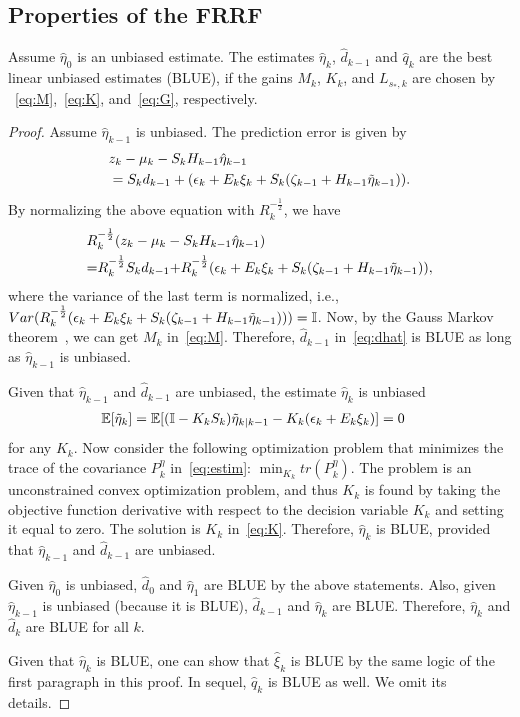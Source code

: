 \documentclass[letterpaper, 10 pt, conference]{ieeeconf}
\begin{document}
\subsection{Properties of the FRRF}\label{app:FRRFpro}
\begin{lemma}
Assume $\hat{\eta}_0$ is an unbiased estimate. The estimates $\hat{\eta}_k$, $\hat{d}_{k-1}$ and $\hat{q}_k$ are the best linear unbiased estimates (BLUE), if the gains $M_k$, $K_k$, and $L_{s_*,k}$ are chosen by
~\eqref{eq:M},~\eqref{eq:K}, and~\eqref{eq:G}, respectively.
\label{lemma:BLUE}
\end{lemma}
\begin{proof}
Assume $\hat{\eta}_{k-1}$ is unbiased. The prediction error is given by
\begin{align*}
    &z_k -\mu_{k} - S_{k}H_{k-1}\hat{\eta}_{k-1}\nonumber\\
    &=S_kd_{k-1}+(\epsilon_k+ E_k\xi_k+S_k(\zeta_{k-1}+H_{k-1}\tilde{\eta}_{k-1})).
\end{align*}
By normalizing the above equation with $R_k^{-\frac{1}{2}}$, we have
\begin{align*}
    &R_k^{-\frac{1}{2}}(z_k -\mu_{k} - S_{k}H_{k-1}\hat{\eta}_{k-1})\nonumber\\
    &{=}R_k^{-\frac{1}{2}}S_kd_{k-1}{+}R_k^{-\frac{1}{2}}(\epsilon_k+ E_k\xi_k+S_k(\zeta_{k-1}+H_{k-1}\tilde{\eta}_{k-1})),
\end{align*}
where the variance of the last term is normalized, i.e., $Var(R_k^{-\frac{1}{2}}(\epsilon_k+ E_k\xi_k+S_k(\zeta_{k-1}+H_{k-1}\tilde{\eta}_{k-1})))=\mathbb{I}$.
Now, by the Gauss Markov theorem~\cite{kailath2000linear}, we can get $M_k$ in~\eqref{eq:M}. Therefore, $\hat{d}_{k-1}$ in~\eqref{eq:dhat} is BLUE as long as $\hat{\eta}_{k-1}$ is unbiased.

Given that $\hat{\eta}_{k-1}$ and $\hat{d}_{k-1}$ are unbiased, the estimate $\hat{\eta}_k$ is unbiased
\begin{align*}
    {\mathbb E}[\tilde{\eta}_k] &= {\mathbb E}[(\mathbb{I}-K_kS_k)\tilde{\eta}_{k|k-1}-K_k(\epsilon_k+E_k\xi_k)]=0
\end{align*}
for any $K_k$.
Now consider the following optimization problem that minimizes the trace of the covariance $P_k^\eta$ in~\eqref{eq:estim}:
$    \min_{K_k} tr(P_{k}^\eta).$
The problem is an unconstrained convex optimization problem, and thus $K_k$ is found by taking the objective function derivative with respect to the decision variable $K_k$ and setting it equal to zero.
The solution is $K_k$ in~\eqref{eq:K}. Therefore, $\hat{\eta}_k$ is BLUE, provided that $\hat{\eta}_{k-1}$ and $\hat{d}_{k-1}$ are unbiased.

Given $\hat{\eta}_0$ is unbiased, $\hat{d}_0$ and $\hat{\eta}_1$ are BLUE by the above statements. Also, given $\hat{\eta}_{k-1}$ is unbiased (because it is BLUE), $\hat{d}_{k-1}$ and $\hat{\eta}_{k}$ are BLUE. Therefore, $\hat{\eta}_k$ and $\hat{d}_k$ are BLUE for all $k$.

Given that $\hat{\eta}_k$ is BLUE, one can show that $\hat{\xi}_k$ is BLUE by the same logic of the first paragraph in this proof. In sequel, $\hat{q}_k$ is BLUE as well. We omit its details.
\end{proof}
\end{document}
